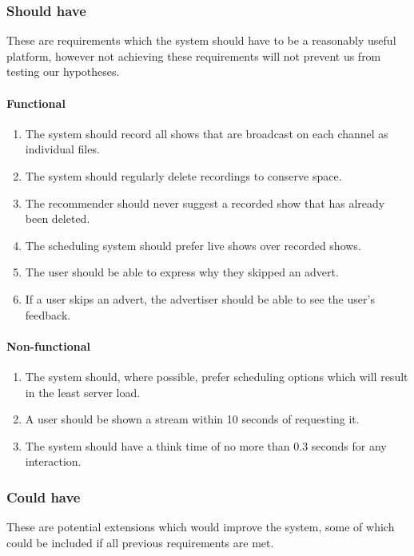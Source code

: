 \subsubsection{Should have}
These are requirements which the system should have to be a reasonably useful platform, however not achieving these requirements will not prevent us from testing our hypotheses.
	\paragraph{Functional}
		\begin{enumerate}
			\item{The system should record all shows that are broadcast on each channel as individual files.}
			\item{The system should regularly delete recordings to conserve space.}
			\item{The recommender should never suggest a recorded show that has already been deleted.}
			\item{The scheduling system should prefer live shows over recorded shows.}
			\item{The user should be able to express why they skipped an advert.}
			\item{If a user skips an advert, the advertiser should be able to see the user's feedback.}
		\end{enumerate}
	\paragraph{Non-functional}
		\begin{enumerate}
			\item{The system should, where possible, prefer scheduling options which will result in the least server load.}
			\item{A user should be shown a stream within 10 seconds of requesting it.}
			\item{The system should have a think time of no more than 0.3 seconds for any interaction.}
		\end{enumerate}
\subsubsection{Could have}
These are potential extensions which would improve the system, some of which could be included if all previous requirements are met.
